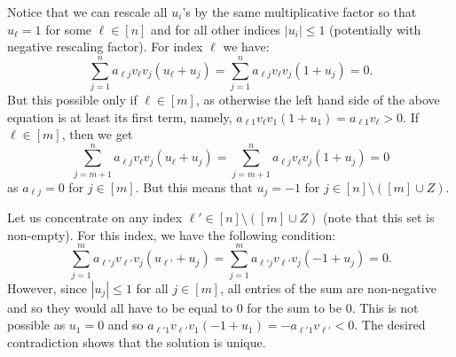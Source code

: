 Notice that we can rescale all $u_i$'s by the same multiplicative factor so that $u_{\ell}=1$ for some $\ell \in [n]$ and for all other indices $|u_i|\leq1$ (potentially with negative rescaling factor). For index $\ell$ we have:
$$
\sum_{j=1}^n a_{\ell j} v_{\ell}v_j(u_{\ell}+u_j) = \sum_{j=1}^n a_{\ell j} v_{\ell}v_j(1+u_j) = 0.
$$
But this possible only if $\ell\in[m]$, as otherwise the left hand side of the above equation is at least its first term, namely, $a_{\ell 1}v_{\ell} v_1(1+u_1) =a_{\ell 1}v_{\ell} > 0$. If $\ell \in[m]$, then we get
$$
\sum_{j=m+1}^n a_{\ell j}v_{\ell} v_j (u_{\ell}+u_j) = \sum_{j=m+1}^n a_{\ell j}v_{\ell} v_j (1+u_j) = 0
$$
as $a_{\ell j}=0$ for $j\in[m]$. But this means that $u_j=-1$ for $j\in[n]\setminus([m]\cup Z)$.

Let us concentrate on any index $\ell'\in [n]\setminus([m]\cup Z)$ (note that this set is non-empty).
For this index, we have the following condition:
$$
\sum_{j=1}^m a_{\ell' j}v_{\ell'}v_j(u_{\ell'}+u_j) = \sum_{j=1}^m a_{\ell' j}v_{\ell'}v_j(-1+u_j) = 0.
$$
However, since $|u_j|\leq 1$ for all $j \in[m]$, all entries of the sum are non-negative and so they would all have to be equal to $0$ for the sum to be $0$. This is not possible as $u_1=0$ and so $a_{\ell'1}v_{\ell'}v_1(-1+u_1) =-a_{\ell'1}v_{\ell'}<0$. The desired contradiction shows that the solution is unique.





